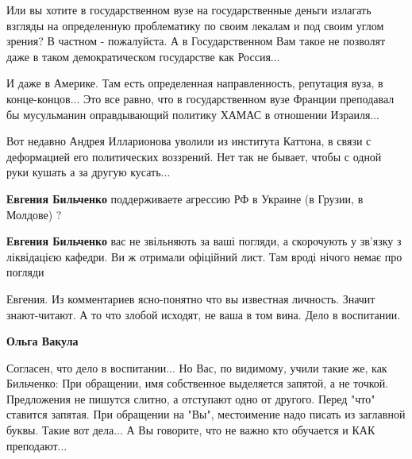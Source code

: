 \begin{itemize}
\begin{itemize}
Или вы хотите в государственном вузе на государственные деньги излагать взгляды
на определенную проблематику по своим лекалам и под своим углом зрения? В
частном - пожалуйста. А в Государственном Вам такое не позволят даже в таком
демократическом государстве как Россия...

И даже в Америке. Там есть определенная направленность, репутация вуза, в
конце-концов... Это все равно, что в государственном вузе Франции преподавал бы
мусульманин оправдывающий политику ХАМАС в отношении Израиля...

Вот недавно Андрея Илларионова уволили из института Каттона, в связи с
деформацией его политических воззрений. Нет так не бывает, чтобы с одной руки
кушать а за другую кусать...


 
\textbf{Евгения Бильченко} поддерживаете агрессию РФ в Украине (в Грузии, в Молдове) ?

 
\textbf{Евгения Бильченко} вас не звільняють за ваші погляди, а скорочують у зв'язку з ліквідацією кафедри. Ви ж отримали офіційний лист. Там вроді нічого немає про погляди 🤔
\end{itemize}

 

Евгения. Из комментариев ясно-понятно что вы известная личность. Значит
знают-читают. А то что злобой исходят, не ваша в том вина. Дело в воспитании.

\begin{itemize}
 
\textbf{Ольга Вакула} 

\obeycr
Согласен, что дело в воспитании...
Но Вас, по видимому, учили такие же, как Бильченко:
При обращении, имя собственное выделяется запятой, а не точкой.
Предложения не пишутся слитно, а отступают одно от другого.
Перед "что" ставится запятая.
При обращении на "Вы", местоимение надо писать из заглавной буквы.
Такие вот дела...
А Вы говорите, что не важно кто обучается и КАК преподают...
\restorecr


\end{itemize}
\end{itemize}
